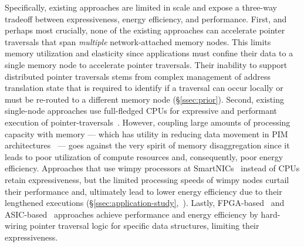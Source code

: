 Specifically, existing approaches are limited in scale and expose a three-way tradeoff between expressiveness, energy efficiency, and performance. First, and perhaps most crucially, none of the existing approaches can accelerate pointer traversals that span \emph{multiple} network-attached memory nodes. 
This limits memory utilization and elasticity since applications must confine their data to a single memory node to accelerate pointer traversals. Their inability to support distributed pointer traversals stems from complex management of address translation state that is required to identify if a traversal can occur locally or must be re-routed to a different memory node (\S\ref{ssec:prior}). Second, existing single-node approaches use full-fledged CPUs for expressive and performant execution of pointer-traversals~\cite{storagefunctions, splinter, aifm, kayak_nsdi_21}. However, coupling large amounts of processing capacity with memory --- which has utility in reducing data movement in PIM architectures~\cite{ahn2015scalable, dai2018graphh, schuiki2018scalable, mutlu2019processing, mutlu2022modern, oliveira2022accelerating, eckert2022eidetic, xie2023mpu, tu2022redcim, lockerman2020livia, asghari2016chameleon, devic2022_PIM, wang2022_Nearstream} ---  goes against the very spirit of memory disaggregation since it leads to poor utilization of compute resources and, consequently, poor energy efficiency. 
Approaches that use wimpy processors at SmartNICs~\cite{rmc_hotnets20, redn} instead of CPUs retain expressiveness, but the limited processing speeds of wimpy nodes curtail their performance and, ultimately lead to lower energy efficiency due to their lengthened executions (\S\ref{ssec:application-study},~\cite{clio}). Lastly, FPGA-based~\cite{clio, strom, sun2023demystifying} and ASIC-based~\cite{impica, walkers} approaches achieve performance and energy efficiency by hard-wiring pointer traversal logic for specific data structures, limiting their expressiveness.  %
